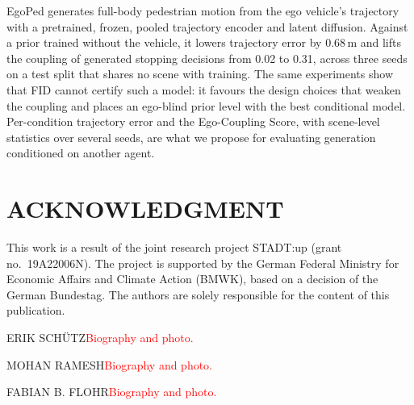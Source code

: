 \documentclass{ieeeoj}
\newcommand{\method}{EgoPed\xspace}
\newcommand{\TODO}[1]{{\textcolor{red}{{#1}}}} %
\begin{document}
\method generates full-body pedestrian motion from the ego vehicle's trajectory with a pretrained, frozen, pooled trajectory encoder and latent diffusion. Against a prior trained without the vehicle, it lowers trajectory error by 0.68\,m and lifts the coupling of generated stopping decisions from 0.02 to 0.31, across three seeds on a test split that shares no scene with training. The same experiments show that FID cannot certify such a model: it favours the design choices that weaken the coupling and places an ego-blind prior level with the best conditional model. Per-condition trajectory error and the Ego-Coupling Score, with scene-level statistics over several seeds, are what we propose for evaluating generation conditioned on another agent.

\section*{ACKNOWLEDGMENT}
This work is a result of the joint research project STADT:up (grant no.\ 19A22006N). The project is supported by the German Federal Ministry for Economic Affairs and Climate Action (BMWK), based on a decision of the German Bundestag. The authors are solely responsible for the content of this publication.




\begin{IEEEbiography}{ERIK SCH\"UTZ}\TODO{Biography and photo.}\end{IEEEbiography}

\begin{IEEEbiography}{MOHAN RAMESH}\TODO{Biography and photo.}\end{IEEEbiography}

\begin{IEEEbiography}{FABIAN B. FLOHR}\TODO{Biography and photo.}\end{IEEEbiography}
\end{document}
